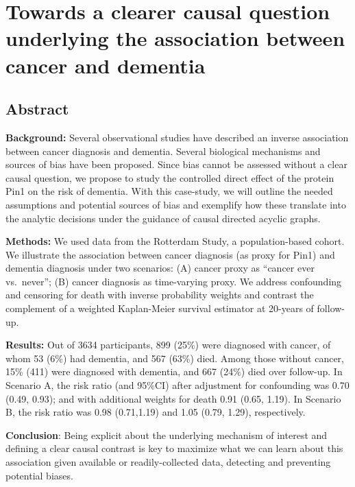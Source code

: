 \documentclass[
]{book}
\begin{document}
\hypertarget{chapter4}{%
\chapter{Towards a clearer causal question underlying the association between cancer and dementia}\label{chapter4}}


\newpage

\hypertarget{abstract-2}{%
\section{Abstract}\label{abstract-2}}

\textbf{Background:} Several observational studies have described an inverse association between cancer diagnosis and dementia. Several biological mechanisms and sources of bias have been proposed. Since bias cannot be assessed without a clear causal question, we propose to study the controlled direct effect of the protein Pin1 on the risk of dementia. With this case-study, we will outline the needed assumptions and potential sources of bias and exemplify how these translate into the analytic decisions under the guidance of causal directed acyclic graphs.

\textbf{Methods:} We used data from the Rotterdam Study, a population-based cohort. We illustrate the association between cancer diagnosis (as proxy for Pin1) and dementia diagnosis under two scenarios: (A) cancer proxy as ``cancer ever vs.~never''; (B) cancer diagnosis as time-varying proxy. We address confounding and censoring for death with inverse probability weights and contrast the complement of a weighted Kaplan-Meier survival estimator at 20-years of follow-up.

\textbf{Results:} Out of 3634 participants, 899 (25\%) were diagnosed with cancer, of whom 53 (6\%) had dementia, and 567 (63\%) died. Among those without cancer, 15\% (411) were diagnosed with dementia, and 667 (24\%) died over follow-up. In Scenario A, the risk ratio (and 95\%CI) after adjustment for confounding was 0.70 (0.49, 0.93); and with additional weights for death 0.91 (0.65, 1.19). In Scenario B, the risk ratio was 0.98 (0.71,1.19) and 1.05 (0.79, 1.29), respectively.

\textbf{Conclusion}: Being explicit about the underlying mechanism of interest and defining a clear causal contrast is key to maximize what we can learn about this association given available or readily-collected data, detecting and preventing potential biases.
\end{document}
